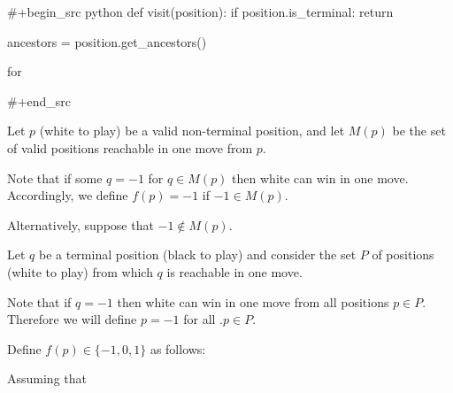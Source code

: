 #+begin_src python
def visit(position):
    if position.is_terminal:
        return

    ancestors = position.get_ancestors()

    for


#+end_src


Let $p$ (white to play) be a valid non-terminal position, and let $M(p)$ be the set of valid positions reachable in one move from $p$.

Note that if some $q = -1$ for $q \in M(p)$ then white can win in one move. Accordingly, we define $f(p) = -1$ if $-1 \in M(p)$.

Alternatively, suppose that $-1 \not\in M(p)$.

Let $q$ be a terminal position (black to play) and consider the set $P$ of positions (white to play) from which $q$ is reachable in one move.

Note that if $q = -1$ then white can win in one move from all positions $p \in P$. Therefore we will define $p = -1$ for all .$p \in P$.






Define $f(p) \in \{-1, 0, 1\}$ as follows:

Assuming that
